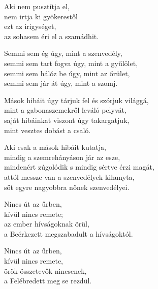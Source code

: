 \begin{dhpverse}

 Aki nem pusztítja el,\\
nem irtja ki gyökerestől\\
ezt az irigységet,\\
az sohasem éri el a szamádhit.

 Semmi sem ég úgy, mint a szenvedély,\\
semmi sem tart fogva úgy, mint a gyűlölet,\\
semmi sem hálóz be úgy, mint az őrület,\\
semmi sem jár át úgy, mint a szomj.

 Mások hibáit úgy tárjuk fel és szórjuk világgá,\\
mint a gabonaszemekről leváló pelyvát,\\
saját hibáinkat viszont úgy takargatjuk,\\
mint vesztes dobást a csaló.

 Aki csak a mások hibáit kutatja,\\
mindig a szemrehányáson jár az esze,\\
mindenért zúgolódik s mindig sértve érzi magát,\\
attól messze van a szenvedélyek kihunyta,\\
sőt egyre nagyobbra nőnek szenvedélyei.

 Nincs út az űrben,\\
kívül nincs remete;\\
az ember hívságoknak örül,\\
a Beérkezett megszabadult a hívságoktól.

 Nincs út az űrben,\\
kívül nincs remete,\\
örök összetevők nincsenek,\\
a Felébredett meg se rezdül.

\end{dhpverse}

